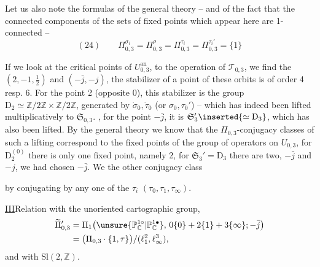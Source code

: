 
Let us also note  the  formulas of the general theory -- and of the fact that the connected components of the sets of fixed points which appear here are 1-connected --
\[
(24)\qquad
\Pi_{0,3}^{\sigma_i}=\Pi_{0,3}^{\rho}
=\Pi_{0,3}^{\tau_i}=\Pi_{0,3}^{\tau_i'}=\{1\}
\]

If we look at the critical points of $U_{0,3}^{\mathrm{an}}$,  to the operation of $\mathcal{T}_{0,3}$, we find the  $(2,-1,\frac12)$ and $(-\bar j,-j)$, the stabilizer of a point of these orbits is of order 4 resp. 6.
For the point 2 (opposite 0), this stabilizer is the group $\mathrm{D}_2\simeq\mathbb{Z}/2\mathbb{Z}\times\mathbb{Z}/2\mathbb{Z}$, generated by $\dot\sigma_0,\dot\tau_0$ (or $\sigma_0,\tau_0'$) -- which has indeed been lifted multiplicatively to $\mathfrak S_{0,3}$.
, for the point $-\bar j$, it is $\mathfrak S_3'\inserted{\simeq\mathrm{D}_3}$, which has also been lifted.
By the general theory we know that the $\Pi_{0,3}$-conjugacy classes of such a lifting correspond to the fixed points of the group of operators  on $U_{0,3}$, for $\mathrm{D}_2^{(0)}$ there is only one fixed point, namely 2, for $\mathfrak S_3'=\mathrm{D}_3$ there are two, $-\bar j$ and $-j$, we had chosen $-\bar j$.
We  the other conjugacy class



by conjugating by any one of the $\tau_i$ $(\tau_0,\tau_1,\tau_\infty)$.

\uline{III}\quad Relation with the unoriented  cartographic group,
\[
\begin{aligned}
\widetilde{\Pi}_{0,3}'
&=\Pi_1\bigl(\unsure{\mathbb{P}_{\mathbb{C}}^{1\circ}|\mathbb{P}_{\mathbb{C}}^{1\bullet}},\,
0\{0\}+2\{1\}+3\{\infty\};-\bar j\bigr)\\
&=\bigl(\Pi_{0,3}\cdot\{1,\tau\}\bigr)/(\ell_1^2,\ell_\infty^3),
\end{aligned}
\]
and with $\mathrm{Sl}(2,\mathbb{Z})$.

